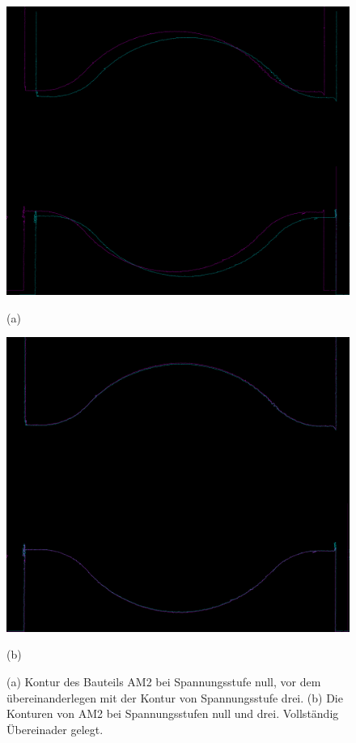 \begin{figure}[H]
    \centering
    \begin{minipage}{0.49\textwidth}
        \centering
        \includegraphics[width=\textwidth]{images/contours_before_matching.png} %
        \caption*{(a)} 
    \end{minipage}\hfill
    \begin{minipage}{0.49\textwidth}
        \centering
        \includegraphics[width=\textwidth]{images/AM2_SP0_stitched_AM2_SP3_stitched_0_0.png} %
        \caption*{(b)}
    \end{minipage}\hfill
    \caption{(a) Kontur des Bauteils AM2 bei Spannungsstufe null, vor dem übereinanderlegen
    mit der Kontur von Spannungsstufe drei.
    (b) Die Konturen von AM2 bei Spannungsstufen null und drei. Vollständig Übereinader
    gelegt.}
        \label{fig:stichted_contours_compare}
\end{figure}

